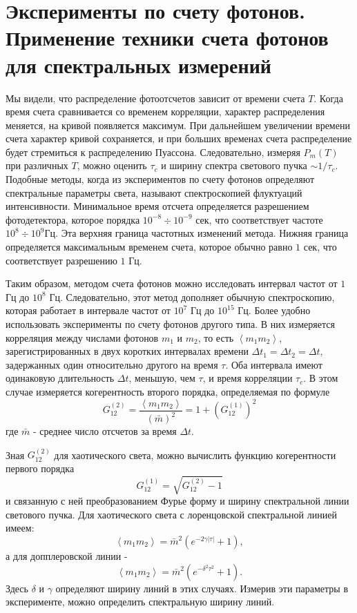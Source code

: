 \section{Эксперименты по счету фотонов. Применение техники счета
  фотонов для спектральных измерений}
Мы видели, что распределение фотоотсчетов зависит от времени счета
$T$. Когда время счета сравнивается со временем корреляции, характер
распределения меняется, на кривой появляется максимум. При дальнейшем
увеличении времени счета характер кривой сохраняется, и при больших
временах счета распределение будет стремиться к распределению
Пуассона. Следовательно, измеряя $P_m\left(T\right)$ при различных
$T$,  можно оценить $\tau_c$ и ширину спектра светового пучка $\sim
1/\tau_c$.  Подобные методы, когда из 
экспериментов по счету фотонов определяют спектральные параметры
света, называют спектроскопией флуктуаций интенсивности. Минимальное
время отсчета определяется разрешением фотодетектора, которое порядка
$10^{-8}\div 10^{-9}$ сек,  что соответствует частоте $10^{8}\div
10^{9}$Гц.  Эта верхняя граница частотных изменений метода. Нижняя
граница определяется максимальным временем счета, которое обычно равно
$1$ сек, что соответствует разрешению  $1$ Гц. 

Таким образом, методом счета фотонов можно исследовать интервал частот
от $1$ Гц до $10^8$ Гц.  Следовательно, этот метод дополняет обычную 
спектроскопию, которая работает в интервале частот от $10^7$ Гц  до
$10^{15}$ Гц.  Более удобно использовать эксперименты по счету фотонов
другого типа. В них измеряется корреляция между числами фотонов $m_1$  и
$m_2$,  то есть $\left<m_1 m_2\right>$,  зарегистрированных в двух
коротких интервалах времени $\Delta t_1 = \Delta t_2 = \Delta t$,
задержанных один относительно другого на время $\tau$.  Оба интервала 
имеют одинаковую длительность $\Delta t$,  меньшую, чем $\tau$,  и
время корреляции $\tau_c$.  В этом случае измеряется когерентность второго порядка,
определяемая по формуле 
\[
G_{12}^{(2)} = \frac{\left<m_1 m_2\right>}{\left(\bar{m}\right)^2} = 
1 + \left(G_{12}^{(1)}\right)^2
\]
где $\bar{m}$ -  среднее число отсчетов за время $\Delta t$. 

Зная $G_{12}^{(2)}$ для хаотического света, можно вычислить функцию
когерентности первого порядка  
\[
G_{12}^{(1)} = \sqrt{G_{12}^{(2)} - 1}
\]
и связанную с ней преобразованием Фурье
форму и ширину спектральной линии светового пучка. Для хаотического света с
лоренцовской спектральной линией имеем: 
\begin{equation}
\left<m_1 m_2\right> = \bar{m}^2\left(e^{-2 \gamma \left|\tau\right|}
+ 1\right),
\label{eqCh4_68}
\end{equation}
а для допплеровской линии -
\begin{equation}
\left<m_1 m_2\right> = \bar{m}^2\left(e^{-\delta^2 \tau^2}
+ 1\right).
\label{eqCh4_69}
\end{equation}
Здесь $\delta$  и $\gamma$ определяют ширину линий в этих
случаях. Измерив эти параметры в эксперименте, можно определить
спектральную ширину линий. 
